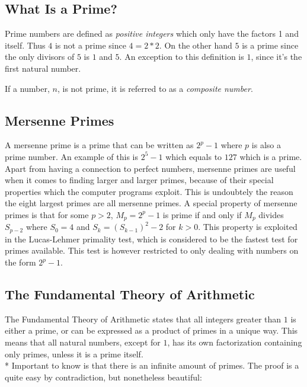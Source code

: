 \documentclass[main.tex]{subfiles}
\begin{document}
\subsection{What Is a Prime?}
Prime numbers are defined as \textit{positive integers} which only have the factors 1 and itself. Thus $4$ is not a prime since $4 = 2 * 2$. On the other hand $5$ is a prime since the only divisors of $5$ is $1$ and $5$. An exception to this definition is $1$, since it's the first natural number.

If a number, $n$, is not prime, it is referred to as a \textit{composite number}.

\subsection{Mersenne Primes}
A mersenne prime is a prime that can be written as $2^{p}-1$ where $p$ is also a prime number. An example of this is $2^5-1$ which equals to $127$ which is a prime. Apart from having a connection to perfect numbers, mersenne primes are useful when it comes to finding larger and larger primes, because of their special properties which the computer programs exploit. This is undoubtely the reason the eight largest primes are all mersenne primes. A special property of mersenne primes is that for some $p>2$, $M_p=2^p-1$ is prime if and only if $M_p$ divides $S_{p-2}$ where $S_0=4$ and $S_k=(S_{k-1})^2-2$ for $k>0$. This property is exploited in the Lucas-Lehmer primality test, which is considered to be the fastest test for primes available. This test is however restricted to only dealing with numbers on the form $2^p-1$. 

\subsection{The Fundamental Theory of Arithmetic}
The Fundamental Theory of Arithmetic \cite{theorem:arithmetic} states that all integers greater than $1$ is either a prime, or can be expressed as a product of primes in a unique way. This means that all natural numbers, except for $1$, has its own factorization containing only primes, unless it is a prime itself.
\newline
\\*
Important to know is that there is an infinite amount of primes. The proof is a quite easy by contradiction, but nonetheless beautiful:
\end{document}
